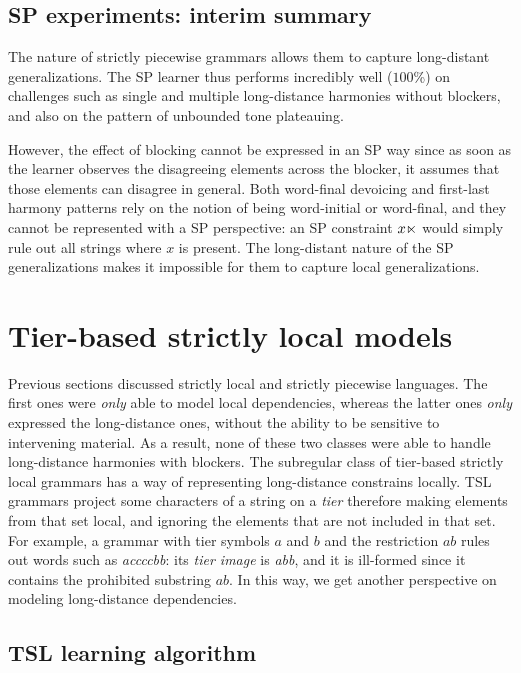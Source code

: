 \subsection{SP experiments: interim summary}


The nature of strictly piecewise grammars allows them to capture long-distant generalizations.
The SP learner thus performs incredibly well ($100$\%) on challenges such 
as single and multiple long-distance harmonies without blockers, and also on the pattern of unbounded tone plateauing.

However, the effect of blocking cannot be expressed in an SP way since as soon as the learner observes the disagreeing elements across the blocker, it assumes that those elements can disagree in general.
Both word-final devoicing and first-last harmony patterns rely on the notion of being word-initial or word-final, and they cannot be represented with a SP perspective: an SP constraint $x\ltimes$ would simply rule out all strings where $x$ is present.
The long-distant nature of the SP generalizations makes it impossible for them to capture local generalizations. 




\section{Tier-based strictly local models}
\label{TSLresultssection}

Previous sections discussed strictly local and strictly piecewise languages.
The first ones were \emph{only} able to model local dependencies, whereas the latter ones \emph{only} expressed the long-distance ones, without the ability to be sensitive to intervening material.
As a result, none of these two classes were able to handle long-distance harmonies with blockers.
The subregular class of tier-based strictly local grammars has a way of representing long-distance constrains locally.
TSL grammars project some characters of a string on a \emph{tier} therefore making elements from that set local, and ignoring the elements that are not included in that set.
For example, a grammar with tier symbols $a$ and $b$ and the restriction $ab$ rules out words such as \emph{accccbb}: its \emph{tier image} is \emph{abb}, and it is ill-formed since it contains the prohibited substring $ab$.
In this way, we get another perspective on modeling long-distance dependencies.


\subsection{TSL learning algorithm}


